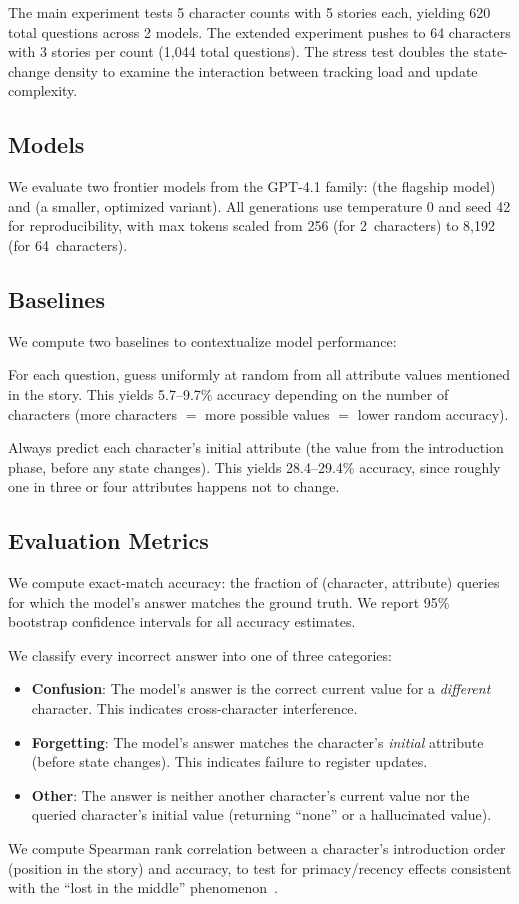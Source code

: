 The main experiment tests 5 character counts with 5 stories each, yielding 620 total questions across 2 models.
The extended experiment pushes to 64 characters with 3 stories per count (1,044 total questions).
The stress test doubles the state-change density to examine the interaction between tracking load and update complexity.

\subsection{Models}

We evaluate two frontier models from the GPT-4.1 family: \gptfull (the flagship model) and \gptmini (a smaller, optimized variant).
All generations use temperature 0 and seed 42 for reproducibility, with max tokens scaled from 256 (for 2~characters) to 8,192 (for 64~characters).

\subsection{Baselines}

We compute two baselines to contextualize model performance:

For each question, guess uniformly at random from all attribute values mentioned in the story.
This yields 5.7--9.7\% accuracy depending on the number of characters (more characters $=$ more possible values $=$ lower random accuracy).

Always predict each character's initial attribute (the value from the introduction phase, before any state changes).
This yields 28.4--29.4\% accuracy, since roughly one in three or four attributes happens not to change.

\subsection{Evaluation Metrics}

We compute exact-match accuracy: the fraction of (character, attribute) queries for which the model's answer matches the ground truth.
We report 95\% bootstrap confidence intervals for all accuracy estimates.

We classify every incorrect answer into one of three categories:
\begin{itemize}[leftmargin=*,itemsep=0pt,topsep=0pt]
\item \textbf{Confusion}: The model's answer is the correct current value for a \emph{different} character. This indicates cross-character interference.
\item \textbf{Forgetting}: The model's answer matches the character's \emph{initial} attribute (before state changes). This indicates failure to register updates.
\item \textbf{Other}: The answer is neither another character's current value nor the queried character's initial value (\eg returning ``none'' or a hallucinated value).
\end{itemize}

We compute Spearman rank correlation between a character's introduction order (position in the story) and accuracy, to test for primacy/recency effects consistent with the ``lost in the middle'' phenomenon~\citep{liu2024lost}.
